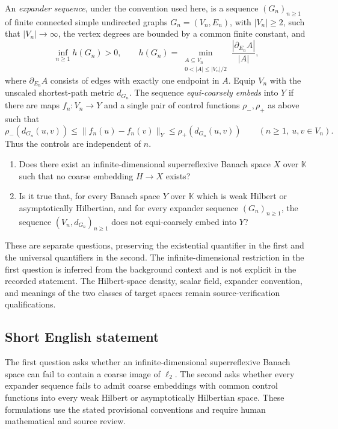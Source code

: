 \documentclass[11pt]{article}
\begin{document}
An \emph{expander sequence}, under the convention used here, is a sequence \((G_n)_{n\ge1}\) of finite connected simple undirected graphs \(G_n=(V_n,E_n)\), with \(|V_n|\ge2\), such that \(|V_n|\to\infty\), the vertex degrees are bounded by a common finite constant, and
\[
 \inf_{n\ge1}h(G_n)>0,\qquad
 h(G_n)=\min_{\substack{A\subseteq V_n\\0<|A|\le |V_n|/2}}
 \frac{|\partial_{E_n}A|}{|A|},
\]
where \(\partial_{E_n}A\) consists of edges with exactly one endpoint in \(A\). Equip \(V_n\) with the unscaled shortest-path metric \(d_{G_n}\). The sequence \emph{equi-coarsely embeds} into \(Y\) if there are maps \(f_n:V_n\to Y\) and a single pair of control functions \(\rho_-,\rho_+\) as above such that
\[
 \rho_-(d_{G_n}(u,v))\le\|f_n(u)-f_n(v)\|_Y
 \le\rho_+(d_{G_n}(u,v))
 \qquad(n\ge1,\ u,v\in V_n).
\]
Thus the controls are independent of \(n\).

\begin{enumerate}
\item Does there exist an infinite-dimensional superreflexive Banach space \(X\) over \(\mathbb K\) such that no coarse embedding \(H\to X\) exists?
\item Is it true that, for every Banach space \(Y\) over \(\mathbb K\) which is weak Hilbert or asymptotically Hilbertian, and for every expander sequence \((G_n)_{n\ge1}\), the sequence \((V_n,d_{G_n})_{n\ge1}\) does not equi-coarsely embed into \(Y\)?
\end{enumerate}
These are separate questions, preserving the existential quantifier in the first and the universal quantifiers in the second. The infinite-dimensional restriction in the first question is inferred from the background context and is not explicit in the recorded statement. The Hilbert-space density, scalar field, expander convention, and meanings of the two classes of target spaces remain source-verification qualifications.
\subsection{Short English statement}
The first question asks whether an infinite-dimensional superreflexive Banach space can fail to contain a coarse image of \(\ell_2\). The second asks whether every expander sequence fails to admit coarse embeddings with common control functions into every weak Hilbert or asymptotically Hilbertian space. These formulations use the stated provisional conventions and require human mathematical and source review.
\end{document}
